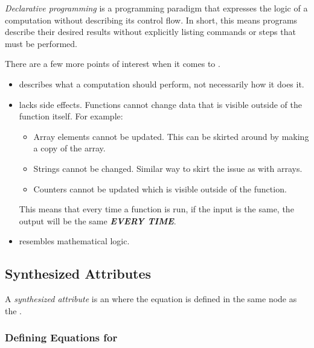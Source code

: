\begin{definition}\label{def:Declarative_Programming}
  \emph{Declarative programming} is a programming paradigm that expresses the logic of a computation without describing its control flow.
  In short, this means programs describe their desired results without explicitly listing commands or steps that must be performed.

  There are a few more points of interest when it comes to .
  \begin{itemize}[noitemsep]
  \item {} describes what a computation should perform, not necessarily how it does it.
  \item {} lacks side effects. Functions cannot change data that is visible outside of the function itself. For example:
    \begin{itemize}[noitemsep]
    \item Array elements cannot be updated. This can be skirted around by making a copy of the array.
    \item Strings cannot be changed. Similar way to skirt the issue as with arrays.
    \item Counters cannot be updated which is visible outside of the function.
    \end{itemize}
    This means that every time a function is run, if the input is the same, the output will be the same \textbf{\emph{EVERY TIME}}.
  \item {} resembles mathematical logic.
  \end{itemize}
\end{definition}

\subsection{Synthesized Attributes}\label{subsec:Synthesized_Attributes}
\begin{definition}\label{def:Synthesized_Attribute}
  A \emph{synthesized attribute} is an  where the equation is defined in the same node as the .
\end{definition}

\subsubsection{Defining Equations for }\label{subsubsec:Define_Synthesized_Equations}

